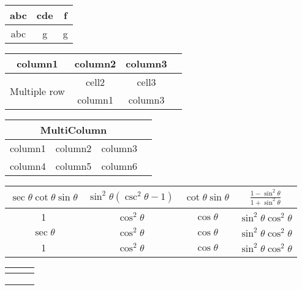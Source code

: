 \documentclass{article}
\begin{document}
\begin{center}
\begin{tabular}{||c|c|c||}
\hline
abc & cde & f  \\ [.5ex]
\hline
\hline
abc & g & g\\
\hline
\end{tabular}
\end{center}


\begin{center}
    \begin{tabular}{|c|c|c|c|}
    \hline
     column1 & column2 & column3  \\
     \hline
     \multirow{3}{70pt}{Multiple row} & cell2 & cell3 \\ 
     \cline{2-3}
     & column1 & column3 \\
     \hline
     
    \end{tabular}
\end{center}

\newpage

\begin{center}

\begin{tabular}{|c|c|c|c|}
\hline
\multicolumn{3}{|c|}{MultiColumn}\\
\hline
  column1 & column2 & column3  \\
  \hline
   column4 & column5 & column6\\
   \hline
\end{tabular}


\begin{tabular}{|c|c|c|c|}
 \hline
    $\sec\theta\cot\theta\sin\theta$ & $\sin^2\theta(\csc^2\theta-1)$ & $\cot\theta\sin\theta$  & $\frac{1-\sin^2\theta}{1+\sin^2\theta} $  \\
\hline
     1 & $\cos^2\theta$ & $\cos\theta$ & $\sin^2\theta\cos^2\theta$ \\
     \hline
     $\sec\theta$ & $\cos^2\theta$ & $\cos\theta$ & $\sin^2\theta\cos^2\theta$ \\
     \hline
     1 & $\cos^2\theta$ & $\cos\theta$ & $\sin^2\theta\cos^2\theta$ \\
     \hline
\end{tabular}
\end{center}

\begin{center}
    \begin{tabular}{|c|c|c|}
    \hline
    \multicolumn{3}{|c|}{}\\
    \hline
    \multicolumn{3}{|c|}{}\\
    \cline{1-1} \cline{3-3}
         \multirow{2}{*}{}& &  \\
         & & \\
         \hline
    \end{tabular}
\end{center}
\end{document}
